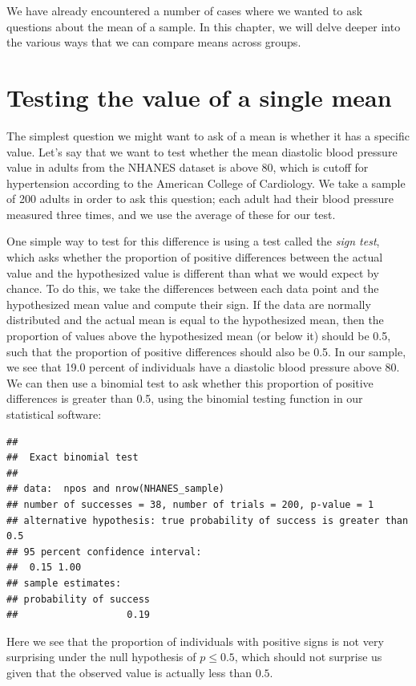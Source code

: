 \documentclass[
  12pt,
]{book}
\begin{document}
We have already encountered a number of cases where we wanted to ask questions about the mean of a sample. In this chapter, we will delve deeper into the various ways that we can compare means across groups.

\hypertarget{single-mean}{%
\section{Testing the value of a single mean}\label{single-mean}}

The simplest question we might want to ask of a mean is whether it has a specific value. Let's say that we want to test whether the mean diastolic blood pressure value in adults from the NHANES dataset is above 80, which is cutoff for hypertension according to the American College of Cardiology. We take a sample of 200 adults in order to ask this question; each adult had their blood pressure measured three times, and we use the average of these for our test.

One simple way to test for this difference is using a test called the \emph{sign test}, which asks whether the proportion of positive differences between the actual value and the hypothesized value is different than what we would expect by chance. To do this, we take the differences between each data point and the hypothesized mean value and compute their sign. If the data are normally distributed and the actual mean is equal to the hypothesized mean, then the proportion of values above the hypothesized mean (or below it) should be 0.5, such that the proportion of positive differences should also be 0.5. In our sample, we see that 19.0 percent of individuals have a diastolic blood pressure above 80. We can then use a binomial test to ask whether this proportion of positive differences is greater than 0.5, using the binomial testing function in our statistical software:

\begin{verbatim}
## 
##  Exact binomial test
## 
## data:  npos and nrow(NHANES_sample)
## number of successes = 38, number of trials = 200, p-value = 1
## alternative hypothesis: true probability of success is greater than 0.5
## 95 percent confidence interval:
##  0.15 1.00
## sample estimates:
## probability of success 
##                   0.19
\end{verbatim}

Here we see that the proportion of individuals with positive signs is not very surprising under the null hypothesis of \(p \le 0.5\), which should not surprise us given that the observed value is actually less than \(0.5\).
\end{document}
